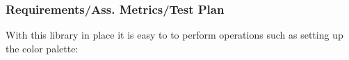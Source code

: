 \documentclass[xcolor=table]{beamer}
\begin{document}
%

\begin{frame}
    \frametitle{Requirements/Ass. Metrics/Test Plan}
    With this library in place it is easy to to perform operations such as setting
    up the color palette:
\end{frame}
\end{document}
